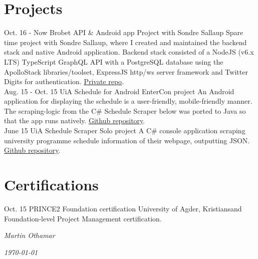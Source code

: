 \documentclass[]{cv-class}
\begin{document}
\section{Projects}
\begin{entrylist}
  \entry
    {Oct. 16 - Now}
    {Brobet API \& Android app}
    {Project with Sondre Sallaup}
    {Spare time project with Sondre Sallaup, where I created and maintained
    the backend stack and native Android application.
    Backend stack consisted of a NodeJS (v6.x LTS) TypeScript GraphQL API with
    a PostgreSQL database using the ApolloStack libraries/toolset, ExpressJS http/ws server
    framework and Twitter Digits for authentication.
    \underline{Private repo}.\\}
  \entry
    {Aug. 15 - Oct. 15}
    {UiA Schedule for Android}
    {EnterCon project}
    {An Android application for displaying the schedule is a user-friendly,
    mobile-friendly manner. The scraping-logic from the C\# Schedule Scraper below
    was ported to Java so that the app runs natively.
    \underline{\href{https://github.com/EnterCon/UiA-Timeplan-Android}
    {Github repository}}.\\}
  \entry
    {June 15}
    {UiA Schedule Scraper}
    {Solo project}
    {A C\# console application scraping university programme schedule information
    of their webpage, outputting JSON.
    \underline{\href{https://github.com/EnterCon/UiA-ScheduleScraper}
    {Github repository}}.\\}
\end{entrylist}


\section{Certifications}
\begin{entrylist}
  \entry
    {Oct. 15}
    {PRINCE2 Foundation certification}
    {University of Agder, Kristiansand}
    {Foundation-level Project Management certification.}
\end{entrylist}

\vspace{1.5cm}
\begin{flushright}
\emph{Martin Othamar}
\end{flushright}
\begin{flushright}
\emph{\today}
\end{flushright}
\end{document}
